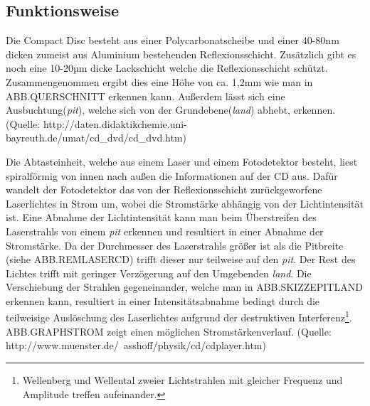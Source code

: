 \subsection{Funktionsweise}
\label{subsec:cdfunktionsweise}

Die Compact Disc besteht aus einer Polycarbonatscheibe und einer 40-80nm dicken
zumeist aus Aluminium bestehenden Reflexionsschicht. Zusätzlich gibt es noch
eine 10-20µm dicke Lackschicht welche die Reflexionsschicht schützt.
Zusammengenommen ergibt dies eine Höhe von ca. 1,2mm wie man in ABB.QUERSCHNITT
erkennen kann. Außerdem lässt sich eine Ausbuchtung(\textit{pit}), welche sich
von der Grundebene(\textit{land}) abhebt, erkennen. (Quelle:
http://daten.didaktikchemie.uni-bayreuth.de/umat/cd_dvd/cd_dvd.htm)

Die Abtasteinheit, welche aus einem Laser und einem Fotodetektor besteht, liest
spiralförmig von innen nach außen die Informationen auf der CD aus. Dafür
wandelt der Fotodetektor das von der Reflexionsschicht zurückgeworfene
Laserlichtes in Strom um, wobei die Stromstärke abhängig von der Lichtintensität
ist. Eine Abnahme der Lichtintensität kann man beim Überstreifen des
Laserstrahls von einem \textit{pit} erkennen und resultiert in einer Abnahme der
Stromstärke. Da der Durchmesser des Laserstrahls größer ist als die Pitbreite
(siehe ABB.REMLASERCD) trifft dieser nur teilweise auf den \textit{pit}. Der
Rest des Lichtes trifft mit geringer Verzögerung auf den Umgebenden
\textit{land}. Die Verschiebung der Strahlen gegeneinander, welche man in
ABB.SKIZZEPITLAND erkennen kann, resultiert in einer Intensitätsabnahme bedingt
durch die teilweisige Auslöschung des Laserlichtes aufgrund der destruktiven
Interferenz\footnote{Wellenberg und Wellental zweier Lichtstrahlen mit gleicher
Frequenz und Amplitude treffen aufeinander.}. ABB.GRAPHSTROM zeigt einen
möglichen Stromstärkenverlauf. (Quelle:
http://www.muenster.de/~asshoff/physik/cd/cdplayer.htm)
